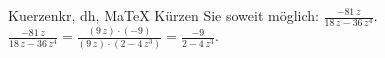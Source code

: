 \begin{MAufgabe}{Kuerzen}{kr, dh, MaTeX}
K\"urzen Sie soweit m\"oglich: $\frac{- 81\, z}{18\, z - 36\, z^4}$.\\ 
\ifLsg\MLoesung
\quad $\frac{- 81\, z}{18\, z - 36\, z^4}=\frac{(9\, z)\cdot(-9)}{(9\, z)\cdot(2 - 4\, z^3)}=\frac{-9}{2 - 4\, z^3}$.\else\relax\fi
 \end{MAufgabe}